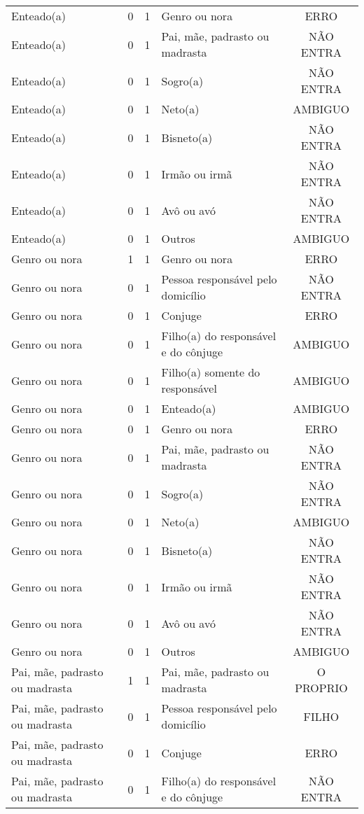 \documentclass[
	12pt,				%
	openright,			%
	twoside,			%
	a4paper,			%
	english,			%
	french,				%
	spanish,			%
	brazil				%
	]{abntex2}
\begin{document}
\begin{anexosenv}
\begin{longtable}{@{}lcclc@{}}
				Enteado(a) & 0 & 1 & Genro ou nora & ERRO \\
				Enteado(a) & 0 & 1 & Pai, mãe, padrasto ou madrasta & NÃO ENTRA \\
				Enteado(a) & 0 & 1 & Sogro(a) & NÃO ENTRA \\
				Enteado(a) & 0 & 1 & Neto(a) & AMBIGUO \\
				Enteado(a) & 0 & 1 & Bisneto(a) & NÃO ENTRA \\
				Enteado(a) & 0 & 1 & Irmão ou irmã & NÃO ENTRA \\
				Enteado(a) & 0 & 1 & Avô ou avó & NÃO ENTRA \\
				Enteado(a) & 0 & 1 & Outros & AMBIGUO \\
				Genro ou nora & 1 & 1 & Genro ou nora & ERRO \\
				Genro ou nora & 0 & 1 & Pessoa responsável pelo domicílio & NÃO ENTRA \\
				Genro ou nora & 0 & 1 & Conjuge & ERRO \\
				Genro ou nora & 0 & 1 & Filho(a) do responsável e do cônjuge & AMBIGUO \\
				Genro ou nora & 0 & 1 & Filho(a) somente do responsável & AMBIGUO \\
				Genro ou nora & 0 & 1 & Enteado(a) & AMBIGUO \\
				Genro ou nora & 0 & 1 & Genro ou nora & ERRO \\
				Genro ou nora & 0 & 1 & Pai, mãe, padrasto ou madrasta & NÃO ENTRA \\
				Genro ou nora & 0 & 1 & Sogro(a) & NÃO ENTRA \\
				Genro ou nora & 0 & 1 & Neto(a) & AMBIGUO \\
				Genro ou nora & 0 & 1 & Bisneto(a) & NÃO ENTRA \\
				Genro ou nora & 0 & 1 & Irmão ou irmã & NÃO ENTRA \\
				Genro ou nora & 0 & 1 & Avô ou avó & NÃO ENTRA \\
				Genro ou nora & 0 & 1 & Outros & AMBIGUO \\
				Pai, mãe, padrasto ou madrasta & 1 & 1 & Pai, mãe, padrasto ou madrasta & O PROPRIO \\
				Pai, mãe, padrasto ou madrasta & 0 & 1 & Pessoa responsável pelo domicílio & FILHO \\
				Pai, mãe, padrasto ou madrasta & 0 & 1 & Conjuge & ERRO \\
				Pai, mãe, padrasto ou madrasta & 0 & 1 & Filho(a) do responsável e do cônjuge & NÃO ENTRA \\

\end{longtable}
\end{anexosenv}
\end{document}
